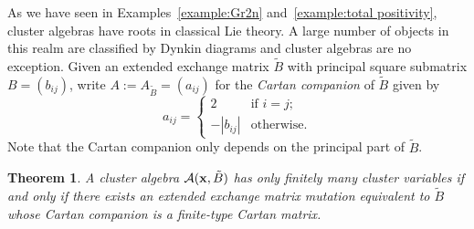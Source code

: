 \documentclass{amsart}
\newtheorem{theorem}{Theorem}[section]
\theoremstyle{definition}
\theoremstyle{remark}
\numberwithin{equation}{section}
\newcommand{\cA}{{\mathcal{A}}}
\newcommand{\x}{{\bf x}}
\begin{document}
  As we have seen in Examples~\ref{example:Gr2n} and~\ref{example:total positivity}, cluster algebras have roots in classical Lie theory.  A large number of objects in this realm are classified by Dynkin diagrams and cluster algebras are no exception.  Given an extended exchange matrix $\tilde B$ with principal square submatrix $B=(b_{ij})$, write $A:=A_{\tilde B}=(a_{ij})$ for the \emph{Cartan companion} of $\tilde B$ given by 
  \[a_{ij}=\begin{cases}2 & \text{if $i=j$;}\\ -|b_{ij}| & \text{otherwise.}\end{cases}\]
  Note that the Cartan companion only depends on the principal part of $\tilde B$.
  \begin{theorem}
    A cluster algebra $\cA(\x,\tilde B)$ has only finitely many cluster variables if and only if there exists an extended exchange matrix mutation equivalent to $\tilde B$ whose Cartan companion is a finite-type Cartan matrix.
  \end{theorem}
\end{document}
